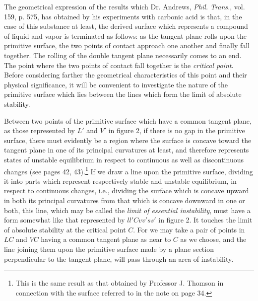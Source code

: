\documentclass[11pt]{article}
\begin{document}
The geometrical expression of the results which Dr. Andrews, \emph{Phil. Trans.}, vol. 159, p. 575, has obtained by his experiments with carbonic acid is that, in the case of this substance at least, the derived surface which represents a compound of liquid and vapor is terminated as follows: as the tangent plane rolls upon the primitive surface, the two points of contact approach one another and finally fall together. The rolling of the double tangent plane necessarily comes to an end. The point where the two points of contact fall together is the \emph{critical point}. Before considering farther the geometrical characteristics of this point and their physical significance, it will be convenient to investigate the nature of the primitive surface which lies between the lines which form the limit of absolute stability.

Between two points of the primitive surface which have a common tangent plane, as those represented by $L'$ and $V'$ in figure 2, if there is no gap in the primitive surface, there must evidently be a region where the surface is concave toward the tangent plane in one of its principal curvatures at least, and therefore represents states of unstable equilibrium in respect to continuous as well as discontinuous changes (see pages 42, 43).\footnote{This is the same result as that obtained by Professor J. Thomson in connection with the surface referred to in the note on page 34.} If we draw a line upon the primitive surface, dividing it into parts which represent respectively stable and unstable equilibrium, in respect to continuous changes, i.e., dividing the surface which is concave upward in both its principal curvatures from that which is concave downward in one or both, this line, which may be called the \emph{limit of essential instability}, must have a form somewhat like that represented by $ll'Cvv'ss'$ in figure 2. It touches the limit of absolute stability at the critical point $C$. For we may take a pair of points in $LC$ and $VC$ having a common tangent plane as near to $C$ as we choose, and the line joining them upon the primitive surface made by a plane section perpendicular to the tangent plane, will pass through an area of instability.
\end{document}

